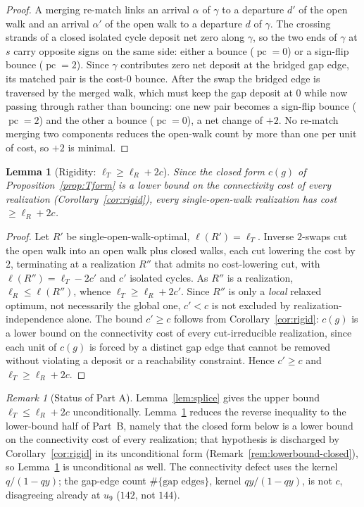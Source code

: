 \documentclass[11pt]{article}
\theoremstyle{plain}
\newtheorem{lemma}[theorem]{Lemma}
\theoremstyle{definition}
\theoremstyle{remark}
\newtheorem{remark}[theorem]{Remark}
\begin{document}
\begin{proof}
A merging re-match links an arrival $\alpha$ of $\gamma$ to a departure $d'$ of
the open walk and an arrival $\alpha'$ of the open walk to a departure $d$ of
$\gamma$. The crossing strands of a closed isolated cycle deposit net zero
along $\gamma$, so the two ends of $\gamma$ at $s$ carry opposite signs on the
same side: either a bounce ($\operatorname{pc}=0$) or a sign-flip bounce
($\operatorname{pc}=2$). Since $\gamma$ contributes zero net deposit at the
bridged gap edge, its matched pair is the cost-$0$ bounce. After the swap the
bridged edge is traversed by the merged walk, which must keep the gap deposit
at $0$ while now passing through rather than bouncing: one new pair becomes a
sign-flip bounce ($\operatorname{pc}=2$) and the other a bounce
($\operatorname{pc}=0$), a net change of $+2$. No re-match merging two
components reduces the open-walk count by more than one per unit of cost, so
$+2$ is minimal.
\end{proof}

\begin{lemma}[Rigidity: $\ell_T\ge\ell_R+2c$]
\label{lem:rigid}
Since the closed form $c(g)$ of Proposition~\textup{\ref{prop:Tform}}
is a lower bound on the connectivity cost of every realization
\textup{(Corollary~\ref{cor:rigid})}, every single-open-walk realization has
cost $\ge\ell_R+2c$.
\end{lemma}

\begin{proof}
Let $R'$ be single-open-walk-optimal, $\ell(R')=\ell_T$. Inverse $2$-swaps cut
the open walk into an open walk plus closed walks, each cut lowering the cost by
$2$, terminating at a realization $R''$ that admits no cost-lowering cut, with
$\ell(R'')=\ell_T-2c'$ and $c'$ isolated cycles. As $R''$ is a realization,
$\ell_R\le\ell(R'')$, whence $\ell_T\ge\ell_R+2c'$. Since $R''$ is only a
\emph{local} relaxed optimum, not necessarily the global one, $c'<c$ is not
excluded by realization-independence alone. The bound $c'\ge c$ follows from
Corollary~\ref{cor:rigid}: $c(g)$ is a lower bound on the connectivity cost of
every cut-irreducible realization, since each unit of $c(g)$ is forced by a
distinct gap edge that cannot be removed without violating a deposit or a
reachability constraint. Hence $c'\ge c$ and $\ell_T\ge\ell_R+2c$.
\end{proof}

\begin{remark}[Status of Part A]
\label{rem:partA-status}
Lemma~\ref{lem:splice} gives the upper bound $\ell_T\le\ell_R+2c$
unconditionally. Lemma~\ref{lem:rigid} reduces the reverse inequality to the
lower-bound half of Part~B, namely that the closed form below is a lower bound
on the connectivity cost of every realization; that hypothesis is discharged
by Corollary~\ref{cor:rigid} in its unconditional form (Remark~\ref{rem:lowerbound-closed}),
so Lemma~\ref{lem:rigid} is unconditional as well. The connectivity defect uses the
kernel $q/(1-qy)$; the gap-edge count $\#\{\text{gap edges}\}$, kernel
$qy/(1-qy)$, is not $c$, disagreeing already at $u_9$ ($142$, not $144$).
\end{remark}
\end{document}
